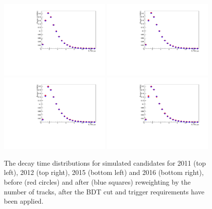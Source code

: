 \begin{figure}[ht]
  \centering
    \includegraphics[width=0.49\textwidth]{Figs/LifetimeMeasurement/2011_Bs2MuMu_MC_weighted_unweighted_comparison.pdf}
    \includegraphics[width=0.49\textwidth]{Figs/LifetimeMeasurement/2012_Bs2MuMu_MC_weighted_unweighted_comparison.pdf}
    \includegraphics[width=0.49\textwidth]{Figs/LifetimeMeasurement/2015_Bs2MuMu_MC_weighted_unweighted_comparison.pdf}
    \includegraphics[width=0.49\textwidth]{Figs/LifetimeMeasurement/2016_Bs2MuMu_MC_weighted_unweighted_comparison.pdf}
  \caption{The decay time distributions for \bsmumu simulated candidates for 2011 (top left), 2012 (top right), 2015 (bottom left) and 2016 (bottom right), before (red circles) and after (blue squares) reweighting by the number of tracks, after the BDT cut and trigger requirements have been applied.}
  \label{fig:BsTomumu_weightDecayTime}
\end{figure}


